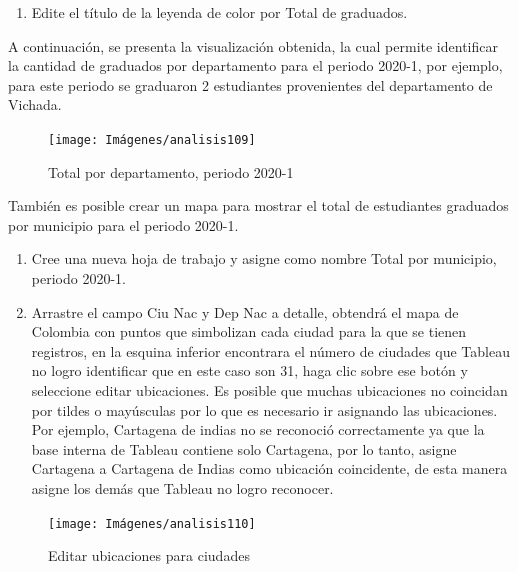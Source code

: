 \documentclass[
]{book}
\providecommand{\tightlist}{%
  \setlength{\itemsep}{0pt}\setlength{\parskip}{0pt}}
\begin{document}
\begin{enumerate}
\def\labelenumi{\arabic{enumi}.}
\setcounter{enumi}{7}
\tightlist
\item
  Edite el título de la leyenda de color por Total de graduados.
\end{enumerate}

A continuación, se presenta la visualización obtenida, la cual permite identificar la cantidad de graduados por departamento para el periodo 2020-1, por ejemplo, para este periodo se graduaron 2 estudiantes provenientes del departamento de Vichada.

\begin{figure}

{\centering \texttt{[image: Imágenes/analisis109]} 

}

\caption{Total por departamento, periodo 2020-1}\label{fig:mapeodepartamentos-fig}
\end{figure}

También es posible crear un mapa para mostrar el total de estudiantes graduados por municipio para el periodo 2020-1.

\begin{enumerate}
\def\labelenumi{\arabic{enumi}.}
\item
  Cree una nueva hoja de trabajo y asigne como nombre Total por municipio, periodo 2020-1.
\item
  Arrastre el campo Ciu Nac y Dep Nac a detalle, obtendrá el mapa de Colombia con puntos que simbolizan cada ciudad para la que se tienen registros, en la esquina inferior encontrara el número de ciudades que Tableau no logro identificar que en este caso son 31, haga clic sobre ese botón y seleccione editar ubicaciones. Es posible que muchas ubicaciones no coincidan por tildes o mayúsculas por lo que es necesario ir asignando las ubicaciones. Por ejemplo, Cartagena de indias no se reconoció correctamente ya que la base interna de Tableau contiene solo Cartagena, por lo tanto, asigne Cartagena a Cartagena de Indias como ubicación coincidente, de esta manera asigne los demás que Tableau no logro reconocer.
\end{enumerate}

\begin{figure}

{\centering \texttt{[image: Imágenes/analisis110]} 

}

\caption{Editar ubicaciones para ciudades}\label{fig:paso2mapeomunicipios-fig}
\end{figure}
\end{document}

